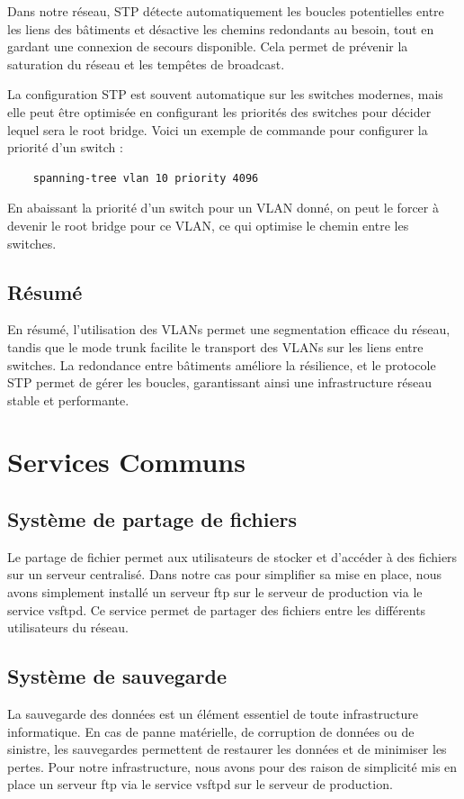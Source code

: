 \documentclass[a4paper,12pt]{report}
\begin{document}
                Dans notre réseau, STP détecte automatiquement les boucles potentielles entre les liens des bâtiments et désactive les chemins redondants au besoin, tout en gardant une connexion de secours disponible. Cela permet de prévenir la saturation du réseau et les tempêtes de broadcast.

                La configuration STP est souvent automatique sur les switches modernes, mais elle peut être optimisée en configurant les priorités des switches pour décider lequel sera le root bridge. Voici un exemple de commande pour configurer la priorité d'un switch :

                \begin{verbatim}
    spanning-tree vlan 10 priority 4096
                \end{verbatim}

                En abaissant la priorité d'un switch pour un VLAN donné, on peut le forcer à devenir le root bridge pour ce VLAN, ce qui optimise le chemin entre les switches.

            \subsection{Résumé}
                En résumé, l'utilisation des VLANs permet une segmentation efficace du réseau, tandis que le mode trunk facilite le transport des VLANs sur les liens entre switches. La redondance entre bâtiments améliore la résilience, et le protocole STP permet de gérer les boucles, garantissant ainsi une infrastructure réseau stable et performante.


        \section{Services Communs}
            \subsection{Système de partage de fichiers}
                Le partage de fichier permet aux utilisateurs de stocker et d'accéder à des fichiers sur un serveur centralisé. Dans notre cas pour simplifier sa mise en place, nous avons simplement installé un serveur ftp sur le serveur de production via le service vsftpd. Ce service permet de partager des fichiers entre les différents utilisateurs du réseau.
            \subsection{Système de sauvegarde}
                La sauvegarde des données est un élément essentiel de toute infrastructure informatique. En cas de panne matérielle, de corruption de données ou de sinistre, les sauvegardes permettent de restaurer les données et de minimiser les pertes. Pour notre infrastructure, nous avons pour des raison de simplicité mis en place un serveur ftp via le service vsftpd sur le serveur de production.
\end{document}
